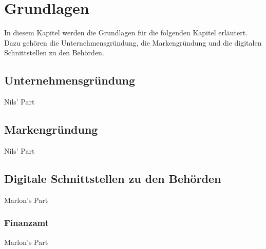 \newpage

\section{Grundlagen} \label{grundlagen}
In diesem Kapitel werden die Grundlagen für die folgenden Kapitel erläutert. Dazu gehören die Unternehmensgründung, die Markengründung und die digitalen Schnittstellen zu den Behörden.


\subsection{Unternehmensgründung} \label{unternehmensgründung}

Nils' Part

\subsection{Markengründung} \label{markengründung}

Nils' Part

\subsection{Digitale Schnittstellen zu den Behörden} \label{digitaleBehoerden}

Marlon's Part

\subsubsection{Finanzamt} \label{finanzamt}

Marlon's Part
